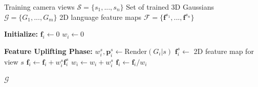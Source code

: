 \begin{algorithm}
\caption{Occam's LGS}
\label{alg:algorithm1}
\small
\begin{algorithmic}[1]
\REQUIRE
\STATE Training camera views $\mathcal{S} = \{s_1, ..., s_n\}$
\STATE Set of trained 3D Gaussians $\mathcal{G} = \{G_1, ..., G_m\}$
\STATE 2D language feature maps $\mathcal{F} = \{\mathbf{f}^{s_1}, ..., \mathbf{f}^{s_n}\}$
\ENSURE

\STATE \textbf{Initialize:}
    \STATE $\mathbf{f}_i \leftarrow 0$ 
    \STATE $w_i \leftarrow 0$ 
\ENDFOR

\STATE \textbf{Feature Uplifting Phase:}
        \STATE $w_i^s, \mathbf{p}_i^s \leftarrow \text{Render}(G_i|s)$ 
        \STATE $\mathbf{f}_i^s \leftarrow$ 2D feature map for view $s$
        \STATE $\mathbf{f}_i \leftarrow \mathbf{f}_i + w_i^s \mathbf{f}_i^s$ 
        \STATE $w_i \leftarrow  w_i + w_i^s$ 
    \ENDFOR
\ENDFOR
{}
    \STATE $\mathbf{f}_i \leftarrow \mathbf{f}_i/w_i$ 
\ENDFOR

\RETURN $\mathcal{G}$
\end{algorithmic}
\end{algorithm}